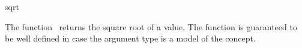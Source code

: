 \begin{ccRefFunction}{sqrt}

\ccDefinition

The function \ccRefName\ returns the square root of a value.
The function is guaranteed to be well defined in case the argument type 
is a model of the  concept. 


{}



\ccSeeAlso

\\
\\

\end{ccRefFunction}
